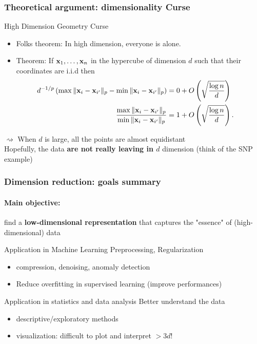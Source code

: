 \documentclass{beamer}\usepackage[]{graphicx}\usepackage[]{color}
\begin{document}
\begin{frame}
\frametitle{Theoretical argument: dimensionality Curse}

\begin{block}{High Dimension Geometry Curse}
\begin{itemize}
\item Folks theorem: In high dimension, everyone is alone.
\item Theorem: If $\mathbf{x}_1,\ldots, \mathbf{x}_n$ in the
hypercube of dimension $d$  such
that their coordinates are i.i.d then
\begin{align*}
\mspace{-20mu} d^{-1/p} \left( \max \|\mathbf{x}_i-\mathbf{x}_{i'}\|_p - \min \|\mathbf{x}_i-\mathbf{x}_{i'}\|_p
\right)  &= 0 + O\left(\sqrt{\frac{\log n}{d}}\right)\\
\frac{\max \|\mathbf{x}_i-\mathbf{x}_{i'}\|_p}{\min \|\mathbf{x}_i-\mathbf{x}_{i'}\|_p} &= 1 +
O\left(\sqrt{\frac{\log n}{d}}\right).
\end{align*}
\end{itemize}
\end{block}

  $\rightsquigarrow$ When $d$ is large, all the points are almost equidistant\\

  Hopefully, the data \alert{\bf are not really leaving in $d$} dimension (think of the SNP example)

\end{frame}

\begin{frame}
  \frametitle{Dimension reduction: goals summary}

  \paragraph{Main objective:} find a \alert{\bf low-dimensional representation} that captures the "essence" of (high-dimensional) data

  \vfill

  \begin{block}{Application in Machine Learning}
  Preprocessing, Regularization
  \begin{itemize}
    \item compression, denoising,  anomaly detection
    \item Reduce overfitting in supervised learning (improve performances)
  \end{itemize}
  \end{block}

\vfill

  \begin{block}{Application in statistics and data analysis}
    Better understand the data 
    \begin{itemize}
      \item descriptive/exploratory methods
      \item visualization: difficult to plot and interpret $> 3d$!
    \end{itemize}
  \end{block}

\end{frame}
\end{document}
